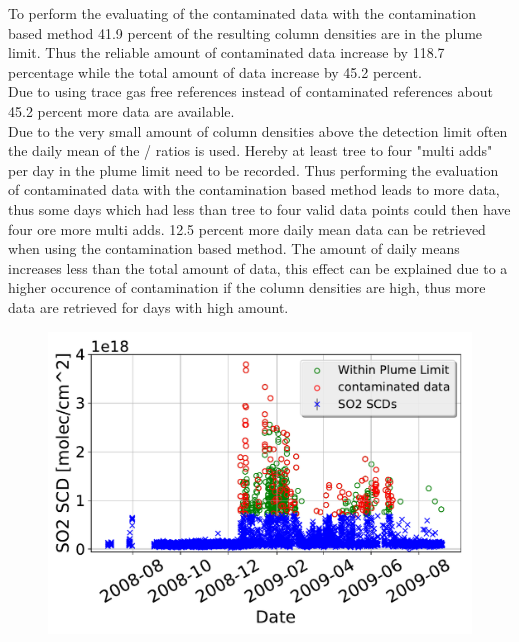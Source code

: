 \documentclass  [
  paper    = a4,
  BCOR     = 10mm,
  twoside,
  fontsize = 12pt,
  fleqn,
  toc      = bibnumbered,
  toc      = listofnumbered,
  numbers  = noendperiod,
  headings = normal,
  listof   = leveldown,
  version  = 3.03
]                                       {scrreprt}
\begin{document}
 	To perform the evaluating of the contaminated data with the contamination based method 41.9 percent of the resulting   column densities are in the plume limit. Thus the reliable amount of contaminated data increase by 118.7 percentage while the total amount of data increase by 45.2 percent.\\
 	Due to using trace gas free references instead of contaminated references about 45.2 percent more data are available. \\
 	Due to the very small amount of   column densities above the detection limit often the daily mean of the /  ratios is used. Hereby at least tree to four "multi adds" per day in the plume limit need to be recorded. Thus performing the evaluation of contaminated data with the contamination based method leads to more data, thus some days which had less than  tree to four valid data points could then have four ore more multi adds. 12.5 percent more daily mean data can be retrieved when using the contamination based method. The amount of daily means increases less than the total amount of data, this effect can be explained due to a higher occurence of contamination if the   column densities are high, thus more data are retrieved for days with high   amount.
	\begin{figure}
		\centering
		\includegraphics[width=0.7\linewidth]{Bilder/tung_so2_novac_sametime}
		\caption{}
		\label{fig:tungso2novacsametime}
	\end{figure}
	
\end{document}
